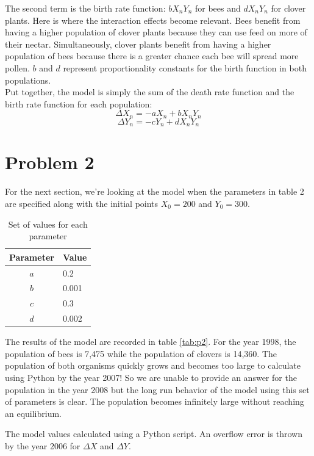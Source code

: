 \documentclass[12pt,a4paper,titlepage]{report}
\begin{document}
		The second term is the birth rate function: \(bX_{n}Y_{n}\) for bees and \(dX_{n}Y_{n}\) for clover plants. Here is where the interaction effects become relevant. Bees benefit from having a higher population of clover plants because they can use feed on more of their nectar. Simultaneously, clover plants benefit from having a higher population of bees because there is a greater chance each bee will spread more pollen. \(b\) and \(d\) represent proportionality constants for the birth function in both populations. \\
		
		Put together, the model is simply the sum of the death rate function and the birth rate function for each population: 
		\[\Delta X_{n} = -aX_{n} + b X_{n}Y_{n}\]
		\[\Delta Y_{n} = -cY_{n} + d X_{n}Y_{n}\]

	\section*{Problem 2}
		For the next section, we're looking at the model when the parameters in table 2 are specified along with the initial points \(X_{0} = 200\) and \(Y_{0} = 300\). 
		\begin{table}[ht]
			\centering
			\begin{tabular}{cl}
				\toprule
				Parameter & Value \\ 
				\midrule 
				\(a\) & 0.2\\ 
				\(b\) & 0.001 \\
				\(c\) & 0.3  \\ 
				\(d\) & 0.002  \\ 
				\bottomrule
			\end{tabular}
			\caption{Set of values for each parameter}
			\label{params1}
		\end{table}
		The results of the model are recorded in table \ref{tab:p2}. For the year 1998, the population of bees is 7,475 while the population of clovers is 14,360. The population of both organisms quickly grows and becomes too large to calculate using Python by the year 2007! So we are unable to provide an answer for the population in the year 2008 but the long run behavior of the model using this set of parameters is clear. The population becomes infinitely large without reaching an equilibrium. 
		\begin{table} 
			\centering
			
			\caption{The model values calculated using a Python script. An overflow error is thrown by the year 2006 for \(\Delta X\) and \(\Delta Y\).}
			\label{tab:p2}
		\end{table}
\end{document}
